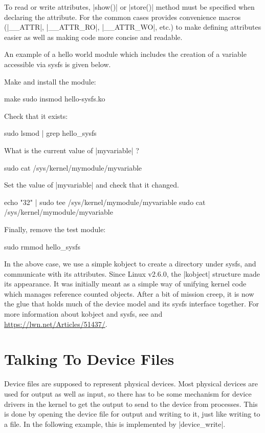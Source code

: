 \documentclass[10pt, oneside]{book}
\begin{document}
To read or write attributes, \cpp|show()| or \cpp|store()| method must be specified when declaring the attribute.
For the common cases  provides convenience macros (\cpp|__ATTR|, \cpp|__ATTR_RO|, \cpp|__ATTR_WO|, etc.) to make defining attributes easier as well as making code more concise and readable.

An example of a hello world module which includes the creation of a variable accessible via sysfs is given below.


Make and install the module:

\begin{codebash}
make
sudo insmod hello-sysfs.ko
\end{codebash}

Check that it exists:

\begin{codebash}
sudo lsmod | grep hello_sysfs
\end{codebash}

What is the current value of \cpp|myvariable| ?

\begin{codebash}
sudo cat /sys/kernel/mymodule/myvariable
\end{codebash}

Set the value of \cpp|myvariable| and check that it changed.

\begin{codebash}
echo "32" | sudo tee /sys/kernel/mymodule/myvariable
sudo cat /sys/kernel/mymodule/myvariable
\end{codebash}

Finally, remove the test module:

\begin{codebash}
sudo rmmod hello_sysfs
\end{codebash}

In the above case, we use a simple kobject to create a directory under sysfs, and communicate with its attributes.
Since Linux v2.6.0, the \cpp|kobject| structure made its appearance.
It was initially meant as a simple way of unifying kernel code which manages reference counted objects.
After a bit of mission creep, it is now the glue that holds much of the device model and its sysfs interface together.
For more information about kobject and sysfs, see  and \url{https://lwn.net/Articles/51437/}.

\section{Talking To Device Files}
\label{sec:device_files}
Device files are supposed to represent physical devices.
Most physical devices are used for output as well as input, so there has to be some mechanism for device drivers in the kernel to get the output to send to the device from processes.
This is done by opening the device file for output and writing to it, just like writing to a file.
In the following example, this is implemented by \cpp|device_write|.
\end{document}
